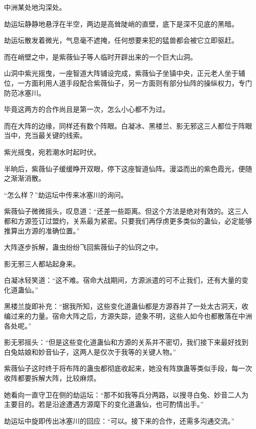 
\begin{this_body}



中洲某处地沟深处。

劫运坛静静地悬浮在半空，两边是高耸陡峭的直壁，底下是深不见底的黑暗。

劫运坛散发着微光，气息毫不遮掩，任何想要来犯的猛兽都会被它立即驱赶。

而在峭壁之中，是紫薇仙子等人临时开辟出来的一个巨大山洞。

山洞中紫光摇曳，一座智道大阵铺设完成，紫薇仙子坐镇中央，正元老人坐于辅位，一方面利用人道手段配合紫薇仙子，另一方面则有部分仙阵的操纵权力，专门防范冰塞川。

毕竟这两方的合作尚且是第一次，怎么小心都不为过。

而在大阵的边缘，同样还有数个阵眼。白凝冰、黑楼兰、影无邪这三人都位于阵眼当中，充当最关键的线索。

紫光摇曳，宛若潮水时起时伏。

半晌后，紫薇仙子缓缓睁开双眼，停下这座智道仙阵。漫溢而出的紫色霞光，便随之渐渐消散。

“怎么样？”劫运坛中传来冰塞川的询问。

紫薇仙子微微摇头，叹息道：“还差一些距离。但这个方法是绝对有效的。这三人都和方源签订过盟约，关系最为紧密。只要我们再俘虏更多类似的蛊仙，必定能够推算出方源的准确位置。”

大阵逐步拆解，蛊虫纷纷飞回紫薇仙子的仙窍之中。

影无邪三人都站起身来。

白凝冰轻笑道：“这不难。宿命大战期间，方源派遣的可不止我们，还有大量的变化道蛊仙。”

黑楼兰旋即补充：“据我所知，这些变化道蛊仙都是方源吞并了一处太古洞天，收编过来的力量。宿命大阵之后，方源失踪，迹象不明，这些人如今也都散落在中洲各处呢。”

影无邪摇头：“但是这些变化道蛊仙和方源的关系并不密切，我们接下来最好找到白兔姑娘和妙音仙子，这两人是仅次于我等的关键人物。”

紫薇仙子这时终于将布阵的蛊虫都彻底收起来，她没有阵旗蛊等类似手段，每一次收阵都要拆解大阵，比较麻烦。

她看向一直守卫在侧的劫运坛：“那不如我等兵分两路，以搜寻白兔、妙音二人为主要目的。若是沿途遭遇方源麾下的变化道蛊仙，也可酌情出手。”

劫运坛中旋即传出冰塞川的回应：“可以。接下来的合作，还需多沟通交流。”


\end{this_body}
